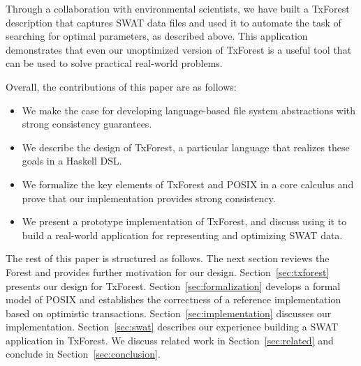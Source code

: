 %
%
Through a collaboration with environmental scientists, we have built a
TxForest description that captures SWAT data files and used it to
automate the task of searching for optimal parameters, as described
above. This application demonstrates that even our unoptimized version
of TxForest is a useful tool that can be used to solve practical
real-world problems. 

%
%
Overall, the contributions of this paper are as follows:
\begin{itemize}
\item We make the case for developing language-based file system
  abstractions with strong consistency guarantees.
\item We describe the design of TxForest, a particular language that
  realizes these goals in a Haskell DSL.
\item We formalize the key elements of TxForest and POSIX in a core
  calculus and prove that our implementation provides strong
  consistency.
\item We present a prototype implementation of TxForest, and discuss
  using it to build a real-world application for representing and
  optimizing SWAT data. 
\end{itemize}
%
The rest of this paper is structured as follows. The next section
reviews the Forest and provides further motivation for our
design. Section~\ref{sec:txforest} presents our design for
TxForest. Section~\ref{sec:formalization} develops a formal model of
POSIX and establishes the correctness of a reference implementation
based on optimistic transactions. Section~\ref{sec:implementation}
discusses our implementation. Section~\ref{sec:swat} describes our
experience building a SWAT application in TxForest. We discuss related
work in Section~\ref{sec:related} and conclude in
Section~\ref{sec:conclusion}.
